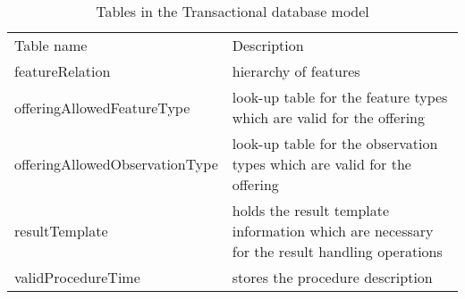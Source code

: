 \begin{table}[]
\centering
\caption{Tables in the Transactional database model}
\label{my-label}
\begin{tabular}{@{}ll@{}}
\toprule
Table name                     & Description                                                                                  \\
featureRelation                & hierarchy of features                                                                        \\
offeringAllowedFeatureType     & look-up table for the feature types which are valid for the offering                         \\
offeringAllowedObservationType & look-up table for the observation types which are valid for the offering                     \\
resultTemplate                 & holds the result template information which are necessary for the result handling operations \\
validProcedureTime             & stores the procedure description                                                            
\end{tabular}
\end{table}

